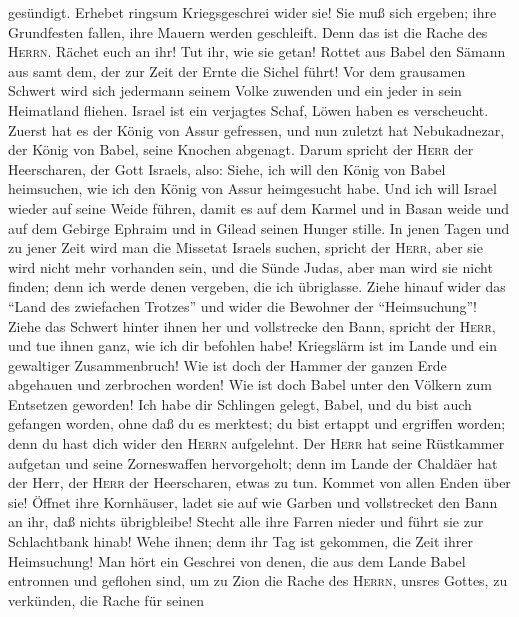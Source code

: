 gesündigt.  Erhebet ringsum Kriegsgeschrei wider sie! Sie
muß sich ergeben; ihre Grundfesten fallen, ihre Mauern werden
geschleift. Denn das ist die Rache des \textsc{Herrn}. Rächet euch an
ihr! Tut ihr, wie sie getan!  Rottet aus Babel den Sämann
aus samt dem, der zur Zeit der Ernte die Sichel führt! Vor dem grausamen
Schwert wird sich jedermann seinem Volke zuwenden und ein jeder in sein
Heimatland fliehen.  Israel ist ein verjagtes Schaf,
Löwen haben es verscheucht. Zuerst hat es der König von Assur gefressen,
und nun zuletzt hat Nebukadnezar, der König von Babel, seine Knochen
abgenagt.  Darum spricht der \textsc{Herr} der
Heerscharen, der Gott Israels, also: Siehe, ich will den König von Babel
heimsuchen, wie ich den König von Assur heimgesucht habe.
 Und ich will Israel wieder auf seine Weide führen, damit
es auf dem Karmel und in Basan weide und auf dem Gebirge Ephraim und in
Gilead seinen Hunger stille.  In jenen Tagen und zu jener
Zeit wird man die Missetat Israels suchen, spricht der \textsc{Herr},
aber sie wird nicht mehr vorhanden sein, und die Sünde Judas, aber man
wird sie nicht finden; denn ich werde denen vergeben, die ich
übriglasse.  Ziehe hinauf wider das ``Land des zwiefachen
Trotzes'' und wider die Bewohner der ``Heimsuchung''! Ziehe das Schwert
hinter ihnen her und vollstrecke den Bann, spricht der \textsc{Herr},
und tue ihnen ganz, wie ich dir befohlen habe! 
Kriegslärm ist im Lande und ein gewaltiger Zusammenbruch!
 Wie ist doch der Hammer der ganzen Erde abgehauen und
zerbrochen worden! Wie ist doch Babel unter den Völkern zum Entsetzen
geworden!  Ich habe dir Schlingen gelegt, Babel, und du
bist auch gefangen worden, ohne daß du es merktest; du bist ertappt und
ergriffen worden; denn du hast dich wider den \textsc{Herrn} aufgelehnt.
 Der \textsc{Herr} hat seine Rüstkammer aufgetan und
seine Zorneswaffen hervorgeholt; denn im Lande der Chaldäer hat der
Herr, der \textsc{Herr} der Heerscharen, etwas zu tun. 
Kommet von allen Enden über sie! Öffnet ihre Kornhäuser, ladet sie auf
wie Garben und vollstrecket den Bann an ihr, daß nichts übrigbleibe!
 Stecht alle ihre Farren nieder und führt sie zur
Schlachtbank hinab! Wehe ihnen; denn ihr Tag ist gekommen, die Zeit
ihrer Heimsuchung!  Man hört ein Geschrei von denen, die
aus dem Lande Babel entronnen und geflohen sind, um zu Zion die Rache
des \textsc{Herrn}, unsres Gottes, zu verkünden, die Rache für seinen
